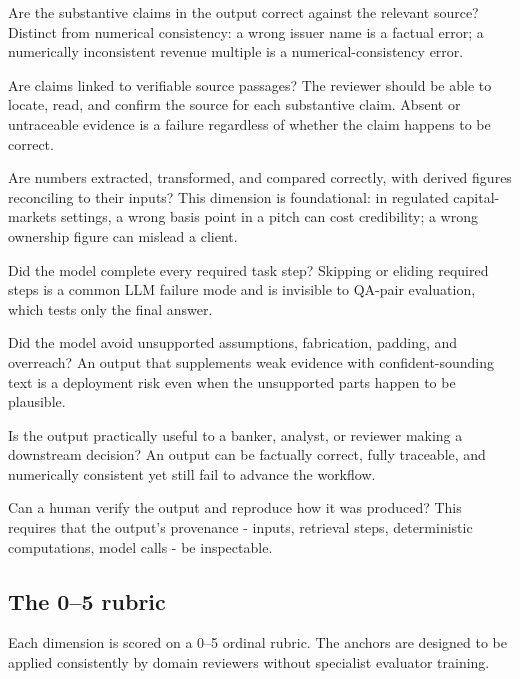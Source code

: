 \documentclass[11pt]{article}
\begin{document}
\begin{description}[leftmargin=*,style=nextline,itemsep=0.3em]
\item[D1. Factual accuracy.] Are the substantive claims in the output correct against the relevant source? Distinct from numerical consistency: a wrong issuer name is a factual error; a numerically inconsistent revenue multiple is a numerical-consistency error.
\item[D2. Evidence traceability.] Are claims linked to verifiable source passages? The reviewer should be able to locate, read, and confirm the source for each substantive claim. Absent or untraceable evidence is a failure regardless of whether the claim happens to be correct.
\item[D3. Numerical consistency.] Are numbers extracted, transformed, and compared correctly, with derived figures reconciling to their inputs? This dimension is foundational: in regulated capital-markets settings, a wrong basis point in a pitch can cost credibility; a wrong ownership figure can mislead a client.
\item[D4. Workflow completeness.] Did the model complete every required task step? Skipping or eliding required steps is a common LLM failure mode and is invisible to QA-pair evaluation, which tests only the final answer.
\item[D5. Source discipline.] Did the model avoid unsupported assumptions, fabrication, padding, and overreach? An output that supplements weak evidence with confident-sounding text is a deployment risk even when the unsupported parts happen to be plausible.
\item[D6. Decision usefulness.] Is the output practically useful to a banker, analyst, or reviewer making a downstream decision? An output can be factually correct, fully traceable, and numerically consistent yet still fail to advance the workflow.
\item[D7. Reviewability and auditability.] Can a human verify the output and reproduce how it was produced? This requires that the output's provenance - inputs, retrieval steps, deterministic computations, model calls - be inspectable.
\end{description}

\subsection{The 0--5 rubric}

Each dimension is scored on a 0--5 ordinal rubric. The anchors are designed to be applied consistently by domain reviewers without specialist evaluator training.
\end{document}
